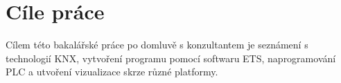 \chapter*{Cíle práce}
{}

Cílem této bakalářské práce po domluvě s konzultantem je seznámení s technologií KNX, vytvoření programu pomocí softwaru ETS, naprogramování PLC a utvoření vizualizace skrze různé platformy.
